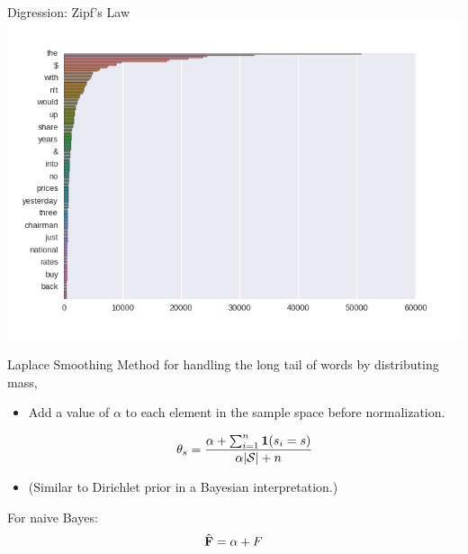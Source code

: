 \documentclass{beamer}
\begin{document}
\begin{frame}{Digression: Zipf's Law}
  \includegraphics[width=\textwidth]{../notebooks/zipf}
\end{frame}

\begin{frame}{Laplace Smoothing}
  Method for handling the long tail of words by distributing mass, 
  \begin{itemize}
  \item  Add a value of $\alpha$ to each element in the sample space before normalization.

    \[ \theta_s =  \frac{\alpha + \sum_{i=1}^n \mathbf{1}(s_i = s)}{\alpha|\mathcal{S}|  + n} \]
    
  \item (Similar to Dirichlet prior in a Bayesian interpretation.) 
  \end{itemize}
  
\pause
  For naive Bayes:
  \[\hat{\mathbf{F}} = \alpha + F\]
 
\end{frame}
\end{document}
